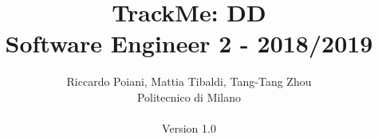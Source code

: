 \documentclass[a4paper]{article}
\begin{document}
\title{TrackMe: DD \\Software Engineer 2 - 2018/2019}
\author{
        Riccardo Poiani, Mattia Tibaldi, Tang-Tang Zhou \\
        Politecnico di Milano\\\\ 
        Version 1.0
}
\maketitle
\newpage
\tableofcontents
\newpage



\newpage



\newpage



\newpage



\newpage



\newpage



\newpage
\end{document}
